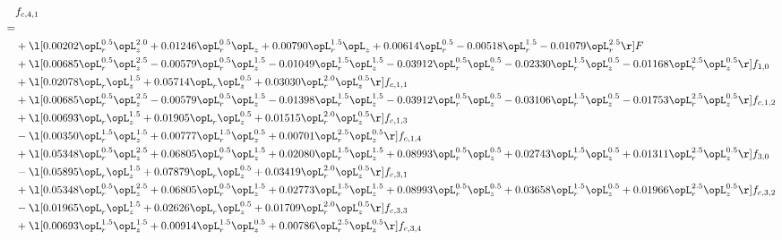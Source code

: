 \begin{alignat}{2} 
\label{eq:f_41_1} 
& f_{c,4,1} \nonumber \\ 
 = \\ 
& + \l[  0.00202 \opL_r^{0.5} \opL_z^{2.0} +  0.01246 \opL_r^{0.5} \opL_z +  0.00790 \opL_r^{1.5} \opL_z +  0.00614 \opL_r^{0.5}   -0.00518 \opL_r^{1.5}   -0.01079 \opL_r^{2.5}  \r] F \nonumber \\ 
& + \l[  0.00685 \opL_r^{0.5} \opL_z^{2.5}   -0.00579 \opL_r^{0.5} \opL_z^{1.5}   -0.01049 \opL_r^{1.5} \opL_z^{1.5}   -0.03912 \opL_r^{0.5} \opL_z^{0.5}   -0.02330 \opL_r^{1.5} \opL_z^{0.5}   -0.01168 \opL_r^{2.5} \opL_z^{0.5}  \r] f_{1,0} \nonumber \\ 
& + \l[  0.02078 \opL_r \opL_z^{1.5} +  0.05714 \opL_r \opL_z^{0.5} +  0.03030 \opL_r^{2.0} \opL_z^{0.5}  \r] f_{c,1,1} \nonumber \\ 
& + \l[  0.00685 \opL_r^{0.5} \opL_z^{2.5}   -0.00579 \opL_r^{0.5} \opL_z^{1.5}   -0.01398 \opL_r^{1.5} \opL_z^{1.5}   -0.03912 \opL_r^{0.5} \opL_z^{0.5}   -0.03106 \opL_r^{1.5} \opL_z^{0.5}   -0.01753 \opL_r^{2.5} \opL_z^{0.5}  \r] f_{c,1,2} \nonumber \\ 
& + \l[  0.00693 \opL_r \opL_z^{1.5} +  0.01905 \opL_r \opL_z^{0.5} +  0.01515 \opL_r^{2.0} \opL_z^{0.5}  \r] f_{c,1,3} \nonumber \\ 
& - \l[  0.00350 \opL_r^{1.5} \opL_z^{1.5} +  0.00777 \opL_r^{1.5} \opL_z^{0.5} +  0.00701 \opL_r^{2.5} \opL_z^{0.5}  \r] f_{c,1,4} \nonumber \\ 
& + \l[  0.05348 \opL_r^{0.5} \opL_z^{2.5} +  0.06805 \opL_r^{0.5} \opL_z^{1.5} +  0.02080 \opL_r^{1.5} \opL_z^{1.5} +  0.08993 \opL_r^{0.5} \opL_z^{0.5} +  0.02743 \opL_r^{1.5} \opL_z^{0.5} +  0.01311 \opL_r^{2.5} \opL_z^{0.5}  \r] f_{3,0} \nonumber \\ 
& - \l[  0.05895 \opL_r \opL_z^{1.5} +  0.07879 \opL_r \opL_z^{0.5} +  0.03419 \opL_r^{2.0} \opL_z^{0.5}  \r] f_{c,3,1} \nonumber \\ 
& + \l[  0.05348 \opL_r^{0.5} \opL_z^{2.5} +  0.06805 \opL_r^{0.5} \opL_z^{1.5} +  0.02773 \opL_r^{1.5} \opL_z^{1.5} +  0.08993 \opL_r^{0.5} \opL_z^{0.5} +  0.03658 \opL_r^{1.5} \opL_z^{0.5} +  0.01966 \opL_r^{2.5} \opL_z^{0.5}  \r] f_{c,3,2} \nonumber \\ 
& - \l[  0.01965 \opL_r \opL_z^{1.5} +  0.02626 \opL_r \opL_z^{0.5} +  0.01709 \opL_r^{2.0} \opL_z^{0.5}  \r] f_{c,3,3} \nonumber \\ 
& + \l[  0.00693 \opL_r^{1.5} \opL_z^{1.5} +  0.00914 \opL_r^{1.5} \opL_z^{0.5} +  0.00786 \opL_r^{2.5} \opL_z^{0.5}  \r] f_{c,3,4} \nonumber \\ 

\end{alignat}

